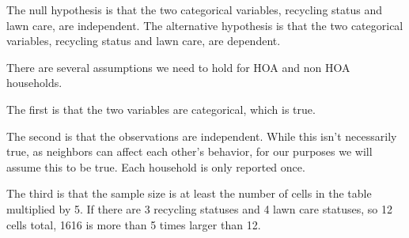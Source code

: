 \documentclass{article}
\begin{document}
The null hypothesis is that the two categorical variables, recycling status and lawn care, are independent.
The alternative hypothesis is that the two categorical variables, recycling status and lawn care, are dependent. 

There are several assumptions we need to hold for HOA and non HOA households. 

The first is that the two variables are categorical, which is true.

The second is that the observations are independent. While this isn't necessarily true, as neighbors can affect each other's behavior, for our purposes we will assume this to be true. Each household is only reported once. 

The third is that the sample size is at least the number of cells in the table multiplied by 5. If there are 3 recycling statuses and 4 lawn care statuses, so 12 cells total, 1616 is more than 5 times larger than 12. 
\end{document}
